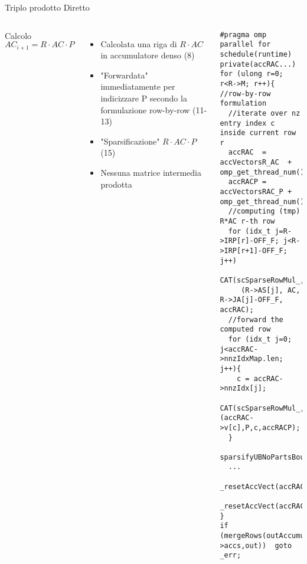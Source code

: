\begin{frame}[fragile]  {Triplo prodotto Diretto}
\begin{columns}
	Calcolo $AC_{i+1} = R \cdot AC \cdot P$
	\begin{itemize}
		\item	Calcolata una riga di $R \cdot AC$\\
		in accumulatore denso (8)
		\item	"Forwardata" immediatamente per indicizzare P
		secondo la formulazione row-by-row (11-13)
		\item	"Sparsificazione" $R\cdot AC\cdot P$ (15)
		\item	Nessuna matrice intermedia prodotta
	\end{itemize}
	\begin{lstlisting}
#pragma omp parallel for schedule(runtime) private(accRAC...)
for (ulong r=0;  r<R->M; r++){  //row-by-row formulation
  //iterate over nz entry index c inside current row r
  accRAC  = accVectorsR_AC  + omp_get_thread_num();
  accRACP = accVectorsRAC_P + omp_get_thread_num();
  //computing (tmp) R*AC r-th row
  for (idx_t j=R->IRP[r]-OFF_F; j<R->IRP[r+1]-OFF_F; j++)
    CAT(scSparseRowMul_,OFF_F)
     (R->AS[j], AC, R->JA[j]-OFF_F, accRAC);
  //forward the computed row
  for (idx_t j=0; j<accRAC->nnzIdxMap.len; j++){
    c = accRAC->nnzIdx[j];  
    CAT(scSparseRowMul_,OFF_F)(accRAC->v[c],P,c,accRACP);
  }
  sparsifyUBNoPartsBounds(outAccumul,accRACP,...);
  ...
  _resetAccVect(accRAC);
  _resetAccVect(accRACP);
}
if (mergeRows(outAccumul->accs,out))  goto _err;
	\end{lstlisting}
\end{columns}
\end{frame}

